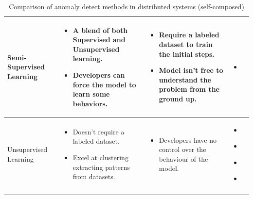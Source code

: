 \begin{longtable}{| p{23mm} | p{46mm} | p{42mm} | p{38mm} |}
    Semi-Supervised Learning &
    \vspace{-8mm}
    \begin{itemize}[leftmargin=0mm,noitemsep,nolistsep,label={}] 
        \item A blend of both Supervised and Unsupervised learning.
        \item Developers can force the model to learn some behaviors.
        \vspace{-7mm}
    \end{itemize} &
    \vspace{-8mm}
    \begin{itemize}[leftmargin=0mm,noitemsep,nolistsep,label={}] 
        \item Require a labeled dataset to train the initial steps.
        \item Model isn’t free to understand the problem from the ground up.
        \vspace{-7mm}
    \end{itemize} &
    \vspace{-8mm}
    \begin{itemize}[leftmargin=0mm,noitemsep,nolistsep,label={}] 
        \item \cite{akcay2018ganomaly}
        \vspace{-7mm}
    \end{itemize} \\ \hline
    
    Unsupervised Learning &
    \vspace{-8mm}
    \begin{itemize}[leftmargin=0mm,noitemsep,nolistsep,label={}] 
        \item Doesn’t require a labeled dataset.
        \item Excel at clustering extracting patterns from datasets.
        \vspace{-7mm}
    \end{itemize} &
    \vspace{-8mm}
    \begin{itemize}[leftmargin=0mm,noitemsep,nolistsep,label={}] 
        \item Developers have no control over the behaviour of the model.
        \vspace{-7mm}
    \end{itemize} &
    \vspace{-8mm}
    \begin{itemize}[leftmargin=0mm,noitemsep,nolistsep,label={}] 
        \item \cite{kumarage2018anomaly}
        \item \cite{zhang2019deep}
        \item \cite{kumarage2019generative}
        \item \cite{khoshnevisan2019rsm}
        \vspace{-7mm}
    \end{itemize} \\ \hline
    \caption{Comparison of anomaly detect methods in distributed systems (self-composed)}
\end{longtable}


